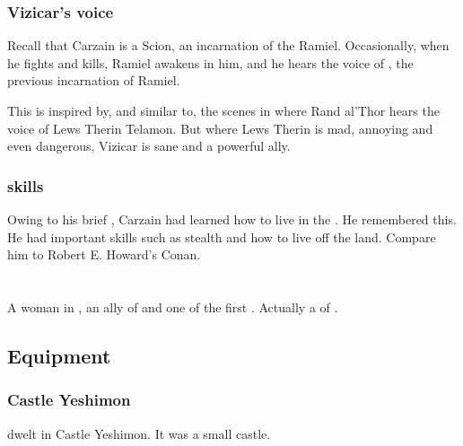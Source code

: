 \subsubsection{Vizicar's voice}
Recall that Carzain is a Scion, an incarnation of the \Malach{} Ramiel. 
Occasionally, when he fights and kills, Ramiel awakens in him, and he hears the voice of \VizicarDurasRespina, the previous incarnation of Ramiel. 

This is inspired by, and similar to, the scenes in  where Rand al'Thor hears the voice of Lews Therin Telamon. But where Lews Therin is mad, annoying and even dangerous, Vizicar is sane and a powerful ally. 





\subsubsection{\Wylde skills}
Owing to his brief , Carzain had learned how to live in the \wylde. 
He remembered this. 
He had important skills such as stealth and how to live off the land. 
Compare him to Robert E. Howard's Conan.















\section{\Delphine}
\index{\Delphine}
A \human{} woman in , an ally of  and one of the first . 
Actually a  of . 









\subsection{Equipment}





\subsubsection{Castle Yeshimon}
\Delphine dwelt in Castle Yeshimon. 
It was a small castle. 









